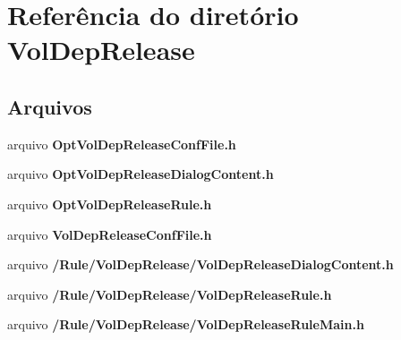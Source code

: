 \section{Referência do diretório Vol\+Dep\+Release}
\label{dir_0d1694768c54be6339bd82bedbe8a894}
\subsection*{Arquivos}
\begin{DoxyCompactItemize}
\item 
arquivo {\bf Opt\+Vol\+Dep\+Release\+Conf\+File.\+h}
\item 
arquivo {\bf Opt\+Vol\+Dep\+Release\+Dialog\+Content.\+h}
\item 
arquivo {\bf Opt\+Vol\+Dep\+Release\+Rule.\+h}
\item 
arquivo {\bf Vol\+Dep\+Release\+Conf\+File.\+h}
\item 
arquivo {\bf /\+Rule/\+Vol\+Dep\+Release/\+Vol\+Dep\+Release\+Dialog\+Content.\+h}
\item 
arquivo {\bf /\+Rule/\+Vol\+Dep\+Release/\+Vol\+Dep\+Release\+Rule.\+h}
\item 
arquivo {\bf /\+Rule/\+Vol\+Dep\+Release/\+Vol\+Dep\+Release\+Rule\+Main.\+h}
\end{DoxyCompactItemize}
